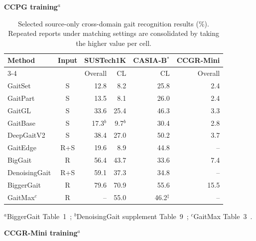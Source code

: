 \begin{table}[t]
\centering
\caption{Selected source-only cross-domain gait recognition results (\%).
Repeated reports under matching settings are consolidated by taking the higher value per cell.}
\label{tab:transfer}
\begingroup
\fontsize{8}{9.4}\selectfont
\setlength{\tabcolsep}{2.8pt}
\renewcommand{\arraystretch}{1.04}
\noindent{}\par\vspace{3pt}
\begin{minipage}[t]{0.49\textwidth}
\textbf{CCPG training}$^a$\par\vspace{2pt}
\begin{tabular*}{\linewidth}{@{\extracolsep{\fill}}lcrrrr@{}}
\toprule
\multirow{2}{*}{Method} & \multirow{2}{*}{Input}
& \multicolumn{2}{c}{SUSTech1K} & CASIA-B$^*$ & CCGR-Mini\\
\cmidrule(lr){3-4}
& & Overall & CL & CL & Overall\\
\midrule
GaitSet & S & 12.8 & 8.2 & 25.8 & 2.4 \\
GaitPart & S & 13.5 & 8.1 & 26.0 & 2.4 \\
GaitGL & S & 33.6 & 25.4 & 46.3 & 3.3 \\
GaitBase & S & 17.3$^{b}$ & 9.7$^{b}$ & 30.4 & 2.8 \\
DeepGaitV2 & S & 38.4 & 27.0 & 50.2 & 3.7 \\
GaitEdge & R+S & 19.6 & 8.9 & 44.8 & -- \\
BigGait & R & 56.4 & 43.7 & 33.6 & 7.4 \\
DenoisingGait & R+S & 59.1 & 37.3 & 34.8 & -- \\
BiggerGait & R & 79.6 & 70.9 & 55.6 & 15.5 \\
GaitMax$^c$ & R & -- & 55.0 & 46.2$^{\ddagger}$ & -- \\
\bottomrule
\end{tabular*}
\par\vspace{3pt}\fontsize{7.5}{8.8}\selectfont
$^a$BiggerGait Table~1~\cite{ye2025biggergait}; $^b$DenoisingGait supplement Table~9~\cite{jin2025denoising}; $^c$GaitMax Table~3~\cite{huang2026gaitmax}.
\end{minipage}\hfill
\begin{minipage}[t]{0.49\textwidth}
\textbf{CCGR-Mini training}$^a$\par\vspace{2pt}

\end{minipage}
\end{table}
